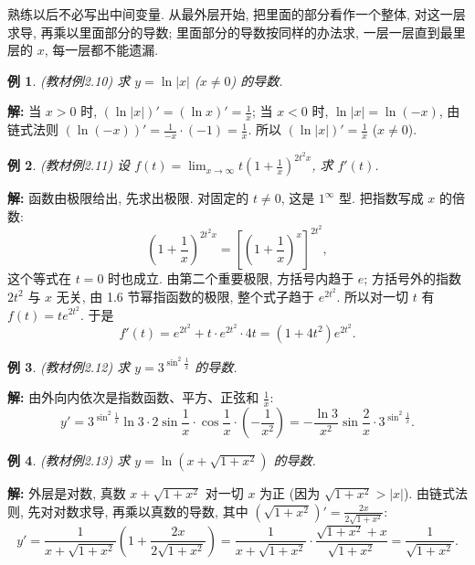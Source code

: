 \documentclass[UTF8,openany]{ctexbook}
\theoremstyle{chinesetextbook}
\newtheorem{example}{例}[section]
\newenvironment{cnsolution}{\par\indent\textbf{解:} \ignorespaces}{\par}
\begin{document}
熟练以后不必写出中间变量. 从最外层开始, 把里面的部分看作一个整体, 对这一层求导, 再乘以里面部分的导数; 里面部分的导数按同样的办法求, 一层一层直到最里层的 $x$, 每一层都不能遗漏.
\begin{example}\label{ex:c2-2-10}
\textnormal{(教材例2.10)} 求 $y=\ln|x|$ ($x\ne0$) 的导数.
\end{example}
\begin{cnsolution}
当 $x>0$ 时, $\displaystyle(\ln|x|)'=(\ln x)'=\frac1x$; 当 $x<0$ 时, $\ln|x|=\ln(-x)$, 由链式法则 $\displaystyle(\ln(-x))'=\frac1{-x}\cdot(-1)=\frac1x$. 所以 $\displaystyle(\ln|x|)'=\frac1x$ ($x\ne0$).
\end{cnsolution}
\begin{example}\label{ex:c2-2-11}
\textnormal{(教材例2.11)} 设 $\displaystyle f(t)=\lim_{x\to\infty}t\left(1+\frac1x\right)^{2t^2x}$, 求 $f'(t)$.
\end{example}
\begin{cnsolution}
函数由极限给出, 先求出极限. 对固定的 $t\ne0$, 这是 $1^\infty$ 型. 把指数写成 $x$ 的倍数:
\[
\left(1+\frac1x\right)^{2t^2x}=\left[\left(1+\frac1x\right)^x\right]^{2t^2},
\]
这个等式在 $t=0$ 时也成立. 由第二个重要极限, 方括号内趋于 $e$; 方括号外的指数 $2t^2$ 与 $x$ 无关, 由 1.6 节幂指函数的极限, 整个式子趋于 $e^{2t^2}$. 所以对一切 $t$ 有 $f(t)=te^{2t^2}$. 于是
\[
f'(t)=e^{2t^2}+t\cdot e^{2t^2}\cdot4t=(1+4t^2)e^{2t^2}.
\]
\end{cnsolution}
\begin{example}\label{ex:c2-2-12}
\textnormal{(教材例2.12)} 求 $y=3^{\sin^2\frac1x}$ 的导数.
\end{example}
\begin{cnsolution}
由外向内依次是指数函数、平方、正弦和 $\displaystyle\frac1x$:
\[
y'=3^{\sin^2\frac1x}\ln3\cdot2\sin\frac1x\cdot\cos\frac1x\cdot\left(-\frac1{x^2}\right)=-\frac{\ln3}{x^2}\sin\frac2x\cdot3^{\sin^2\frac1x}.
\]
\end{cnsolution}
\begin{example}\label{ex:c2-2-13}
\textnormal{(教材例2.13)} 求 $y=\ln\left(x+\sqrt{1+x^2}\right)$ 的导数.
\end{example}
\begin{cnsolution}
外层是对数, 真数 $x+\sqrt{1+x^2}$ 对一切 $x$ 为正 (因为 $\sqrt{1+x^2}>|x|$). 由链式法则, 先对对数求导, 再乘以真数的导数, 其中 $\displaystyle\left(\sqrt{1+x^2}\right)'=\frac{2x}{2\sqrt{1+x^2}}$:
\[
y'=\frac1{x+\sqrt{1+x^2}}\left(1+\frac{2x}{2\sqrt{1+x^2}}\right)=\frac1{x+\sqrt{1+x^2}}\cdot\frac{\sqrt{1+x^2}+x}{\sqrt{1+x^2}}=\frac1{\sqrt{1+x^2}}.
\]
\end{cnsolution}
\end{document}

